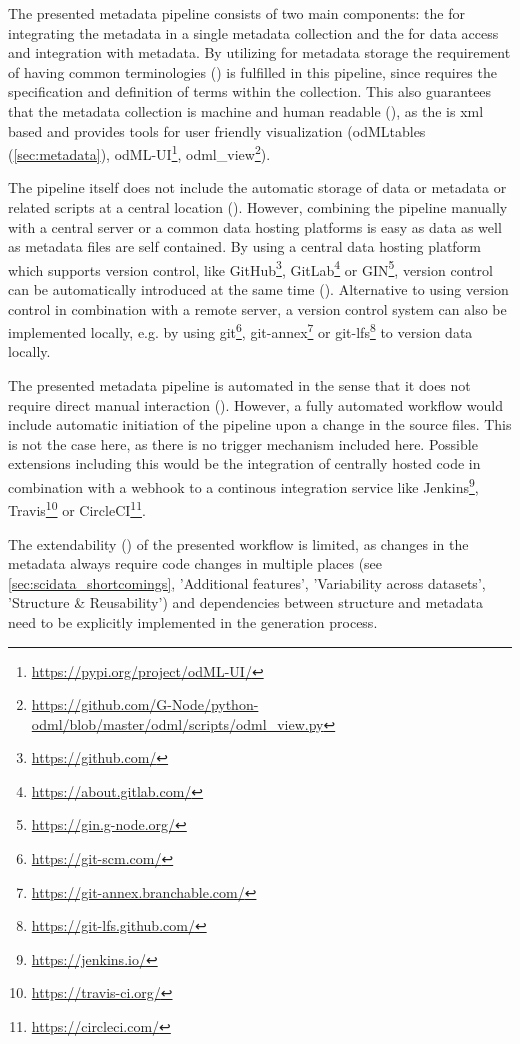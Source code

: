The presented metadata pipeline consists of two main components: the  for integrating the metadata in a single  metadata collection and the  for data access and integration with metadata. By utilizing  for metadata storage the requirement of having common terminologies () is fulfilled in this pipeline, since  requires the specification and definition of terms within the collection. This also guarantees that the metadata collection is machine and human readable (), as the  is xml based and provides tools for user friendly visualization (odMLtables (\cref{sec:metadata}), odML-UI\footnote{\url{https://pypi.org/project/odML-UI/}}, odml\_view\footnote{\url{https://github.com/G-Node/python-odml/blob/master/odml/scripts/odml_view.py}}).

The pipeline itself does not include the automatic storage of data or metadata or related scripts at a central location (). However, combining the pipeline manually with a central server or a common data hosting platforms is easy as data as well as metadata files are self contained. By using a central data hosting platform which supports version control, like GitHub\footnote{\url{https://github.com/}}, GitLab\footnote{\url{https://about.gitlab.com/}} or GIN\footnote{\url{https://gin.g-node.org/}}, version control can be automatically introduced at the same time (). Alternative to using version control in combination with a remote server, a version control system can also be implemented locally, e.g. by using git\footnote{\url{https://git-scm.com/}}, git-annex\footnote{\url{https://git-annex.branchable.com/}} or git-lfs\footnote{\url{https://git-lfs.github.com/}} to version data locally.

The presented metadata pipeline is automated in the sense that it does not require direct manual interaction (). However, a fully automated workflow would include automatic initiation of the pipeline upon a change in the source files. This is not the case here, as there is no trigger mechanism included here. Possible extensions including this would be the integration of centrally hosted code in combination with a webhook to a continous integration service like Jenkins\footnote{\url{https://jenkins.io/}}, Travis\footnote{\url{https://travis-ci.org/}} or CircleCI\footnote{\url{https://circleci.com/}}.

The extendability () of the presented workflow is limited, as changes in the metadata always require code changes in multiple places (see \ref{sec:scidata_shortcomings}, 'Additional features', 'Variability across datasets', 'Structure \& Reusability') and dependencies between structure and metadata need to be explicitly implemented in the  generation process.


